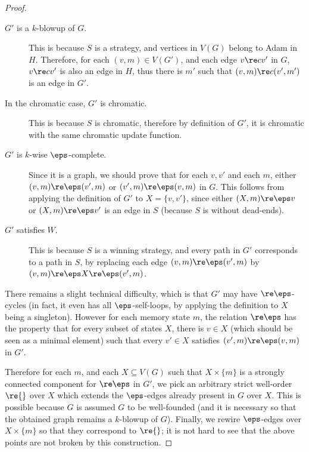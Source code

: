 \begin{proof}
    \begin{description}
        \item[$G'$ is a $k$-blowup of $G$.]
        This is because $S$ is a strategy, and vertices in $V(G)$ belong to Adam in $H$.
        Therefore, for each $(v,m) \in V(G')$, and each edge $v \re c v'$ in $G$, $v \re c v'$ is also an edge in $H$, thus there is $m'$ such that $(v,m) \re c (v',m')$ is an edge in $G'$.
        \item[In the chromatic case, $G'$ is chromatic.]
        This is because $S$ is chromatic, therefore by definition of $G'$, it is chromatic with the same chromatic update function.
        \item[$G'$ is $k$-wise $\eps$-complete.] Since it is a graph, we should prove that for each $v,v'$ and each $m$, either $(v,m) \re \eps (v',m)$ or $(v',m) \re \eps (v,m)$ in $G$.
        This follows from applying the definition of $G'$ to $X=\{v,v'\}$, since either $(X,m) \re \eps v$ or $(X,m) \re \eps v'$ is an edge in $S$ (because $S$ is without dead-ends).
        \item[$G'$ satisfies $W$.] This is because $S$ is a winning strategy, and every path in $G'$ corresponds to a path in $S$, by replacing each edge $(v,m)\re \eps(v',m)$ by $(v,m) \re \eps X \re \eps (v',m)$.
    \end{description}

    There remains a slight technical difficulty, which is that $G'$ may have $\re \eps$-cycles (in fact, it even has all $\eps$-self-loops, by applying the definition to $X$ being a singleton).
    However for each memory state $m$, the relation $\re \eps$ has the property that for every subset of states $X$, there is $v \in X$ (which should be seen as a minimal element) such that every $v' \in X$ satisfies $(v',m) \re \eps (v,m)$ in $G'$.

    Therefore for each $m$, and each $X\subseteq V(G)$ such that $X \times \{m\}$ is a strongly connected component for $\re \eps$ in $G'$, we pick an arbitrary strict well-order $\re{}$ over $X$ which extends the $\eps$-edges already present in $G$ over $X$.
    This is possible because $G$ is assumed $G$ to be well-founded (and it is necessary so that the obtained graph remains a $k$-blowup of $G$).
    Finally, we rewire $\eps$-edges over $X \times \{m\}$ so that they correspond to $\re{}$; it is not hard to see that the above points are not broken by this construction.
\end{proof}